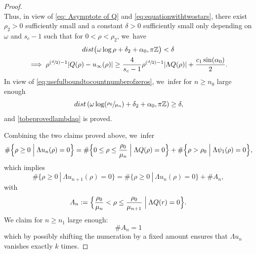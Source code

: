 \documentclass[10pt]{article}
\newcommand{\Psfrac}[2]{(\sfrac{#1}{#2})}
\theoremstyle{plain}
\theoremstyle{definition}
\begin{document}
\begin{proof}
\[\]
Thus, in view of \eqref{eq: Asymptote of Q} and \eqref{eq:equationwithtwostars}, there exist $\rho_2>0$ sufficiently small and a constant $\delta>0$ sufficiently small only depending on $\omega$ and $s_c-1$ such that for $0<\rho<\rho_2$, we~have
\begin{multline*}
\textrm{dist}\big(\omega\log\rho+\delta_2+\alpha_0, \pi\mathbb{Z}\big)<\delta\\
\implies \rho^{\Psfrac{d}{2}-1}|Q(\rho) - u_\infty(\rho)|\geq \frac{4}{s_c-1}\rho^{\Psfrac{d}{2}-1}|\Lambda Q(\rho)|+\frac{c_1\sin(\alpha_0)}{2}.
\end{multline*}
In view of \eqref{eq:usefulboundtocountnumberofzeros}, we~infer for $n\ge n_0$ large enough
\begin{equation}\label{eq:equationwithonestar}
\textrm{dist}\left(\omega\log(\sfrac{\rho_0}{\mu_n})+\delta_2+\alpha_0, \pi\mathbb{Z}\right)\geq \delta,
\end{equation}
and \eqref{tobeprovedlambdaq} is proved.

Combining the two claims proved above, we~infer
\[
\#\Big\{\rho\geq 0\Bigm|\Lambda u_n(\rho)=0\Big\}
= \#\Big\{0\leq \rho\leq \frac{\rho_0}{\mu_n}\Bigm|\Lambda Q(\rho)=0 \Big\}+ \#\Big\{\rho>\rho_0\Bigm|\Lambda\psi_1(\rho)=0\Big\},
\]
which implies
\[
\#\{\rho\geq 0 \ | \ \Lambda u_{n+1}(\rho)=0\} = \#\{\rho\geq 0 \ | \ \Lambda u_n(\rho)=0\} + \# A_n,
\]
with
\[
A_n := \Big\{\frac{\rho_0}{\mu_n}< \rho\leq \frac{\rho_0}{\mu_{n+1}}\Bigm|\Lambda Q(r)=0 \Big\}.
\]
We claim for $n\geq n_1$ large enough:
\begin{equation}
\label{estcarajo}
\# A_n=1
\end{equation}
which by possibly shifting the numeration by a fixed amount ensures that $\Lambda u_n$ vanishes exactly $k$ times.


\end{proof}
\end{document}
